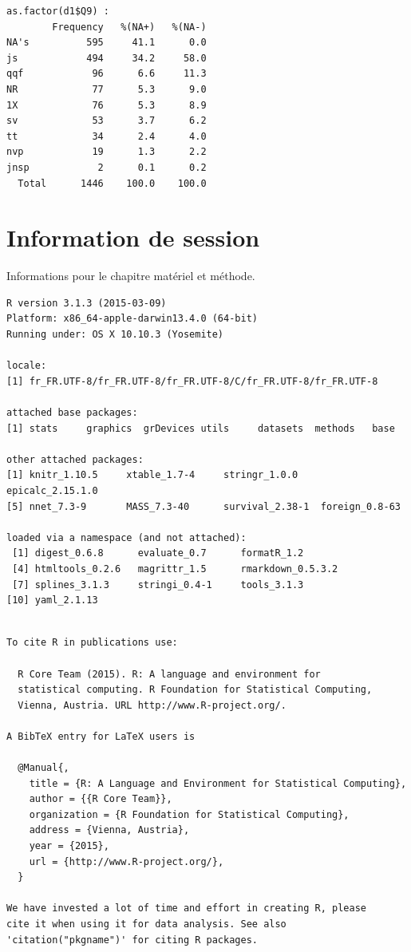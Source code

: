 \documentclass[]{article}
\begin{document}
\begin{verbatim}
as.factor(d1$Q9) : 
        Frequency   %(NA+)   %(NA-)
NA's          595     41.1      0.0
js            494     34.2     58.0
qqf            96      6.6     11.3
NR             77      5.3      9.0
1X             76      5.3      8.9
sv             53      3.7      6.2
tt             34      2.4      4.0
nvp            19      1.3      2.2
jnsp            2      0.1      0.2
  Total      1446    100.0    100.0
\end{verbatim}

\section{Information de session}\label{information-de-session}

Informations pour le chapitre matériel et méthode.

\begin{verbatim}
R version 3.1.3 (2015-03-09)
Platform: x86_64-apple-darwin13.4.0 (64-bit)
Running under: OS X 10.10.3 (Yosemite)

locale:
[1] fr_FR.UTF-8/fr_FR.UTF-8/fr_FR.UTF-8/C/fr_FR.UTF-8/fr_FR.UTF-8

attached base packages:
[1] stats     graphics  grDevices utils     datasets  methods   base     

other attached packages:
[1] knitr_1.10.5     xtable_1.7-4     stringr_1.0.0    epicalc_2.15.1.0
[5] nnet_7.3-9       MASS_7.3-40      survival_2.38-1  foreign_0.8-63  

loaded via a namespace (and not attached):
 [1] digest_0.6.8      evaluate_0.7      formatR_1.2      
 [4] htmltools_0.2.6   magrittr_1.5      rmarkdown_0.5.3.2
 [7] splines_3.1.3     stringi_0.4-1     tools_3.1.3      
[10] yaml_2.1.13      
\end{verbatim}

\begin{verbatim}

To cite R in publications use:

  R Core Team (2015). R: A language and environment for
  statistical computing. R Foundation for Statistical Computing,
  Vienna, Austria. URL http://www.R-project.org/.

A BibTeX entry for LaTeX users is

  @Manual{,
    title = {R: A Language and Environment for Statistical Computing},
    author = {{R Core Team}},
    organization = {R Foundation for Statistical Computing},
    address = {Vienna, Austria},
    year = {2015},
    url = {http://www.R-project.org/},
  }

We have invested a lot of time and effort in creating R, please
cite it when using it for data analysis. See also
'citation("pkgname")' for citing R packages.
\end{verbatim}
\end{document}

